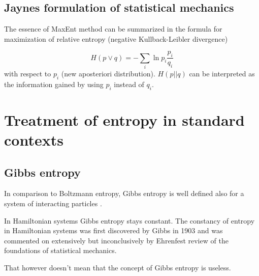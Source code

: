 \documentclass[a4paper,12pt]{article}
\begin{document}
\subsection{Jaynes formulation of statistical mechanics}

The essence of MaxEnt method can be summarized in the formula for maximization of relative entropy (negative Kullback-Leibler divergence)

\begin{displaymath}
  H(p\lor q) = -\sum_i \ln p_i \frac{p_i}{q_i}
\end{displaymath}
with respect to $p_i$ (new aposteriori distribution). $H(p||q)$ can be interpreted as the information gained by using $p_i$ instead of $q_i$.


\section{Treatment of entropy in standard contexts}

\subsection{Gibbs entropy}

In comparison to Boltzmann entropy, Gibbs entropy is well defined also for a system of interacting particles \cite{Jaynes:1965gg}.


In Hamiltonian systems Gibbs entropy stays constant.
The constancy of entropy in Hamiltonian systems was first discovered by Gibbs in 1903 and was commented on extensively but inconclusively by Ehrenfest review \cite{Ehrenfest:1960ia} of the foundations of statistical mechanics.

That however doesn't mean that the concept of Gibbs entropy 
is useless.

\end{document}
